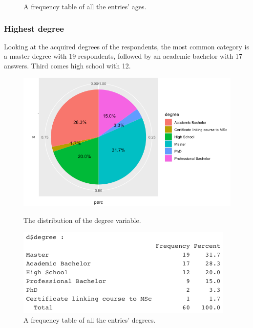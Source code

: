 \begin{figure}[!htb]
	\caption{A frequency table of all the entries' ages.}\label{fig:ageFreq}
	\endminipage\hfill
\end{figure}

\subsubsection{Highest degree}
Looking at the acquired degrees of the respondents, the most common category is a master degree with 19 respondents, followed by an academic bachelor with 17 answers. Third comes high school with 12.
\begin{figure}[!htb]
	\includegraphics[width=\linewidth]{../LaTeX/Figures/Environments/DegreePlot.png}
	\caption{The distribution of the degree variable.}\label{fig:degreePlot}
	\endminipage\hfill
	\includegraphics[width=\linewidth]{../LaTeX/Figures/Environments/DegreeFreq.png}
	\caption{A frequency table of all the entries' degrees.}\label{fig:degreeFreq}
	\endminipage\hfill
\end{figure}

